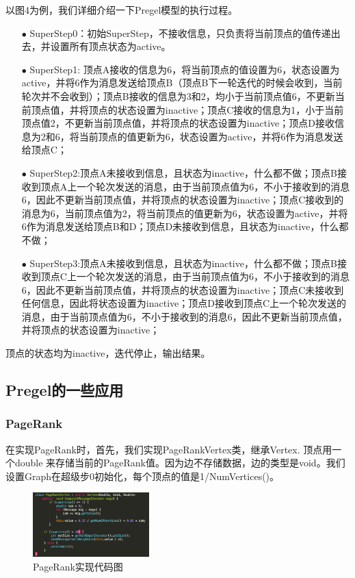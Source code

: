\documentclass[10pt,a4paper,twocolumn,twoside,UTF8]{ctexart}
\begin{document}
	以图4为例，我们详细介绍一下Pregel模型的执行过程。\par	
	\begin{itemize}
		\item[$\bullet$] SuperStep0：初始SuperStep，不接收信息，只负责将当前顶点的值传递出去，并设置所有顶点状态为active。
		\item[$\bullet$] SuperStep1: 顶点A接收的信息为6，将当前顶点的值设置为6，状态设置为active，并将6作为消息发送给顶点B（顶点B下一轮迭代的时候会收到，当前轮次并不会收到）；顶点B接收的信息为3和2，均小于当前顶点值6，不更新当前顶点值，并将顶点的状态设置为inactive；顶点C接收的信息为1，小于当前顶点值2，不更新当前顶点值，并将顶点的状态设置为inactive；顶点D接收信息为2和6，将当前顶点的值更新为6，状态设置为active，并将6作为消息发送给顶点C；
		\item[$\bullet$]SuperStep2:顶点A未接收到信息，且状态为inactive，什么都不做；顶点B接收到顶点A上一个轮次发送的消息，由于当前顶点值为6，不小于接收到的消息6，因此不更新当前顶点值，并将顶点的状态设置为inactive；顶点C接收到的消息为6，当前顶点值为2，将当前顶点的值更新为6，状态设置为active，并将6作为消息发送给顶点B和D；顶点D未接收到信息，且状态为inactive，什么都不做；
		\item[$\bullet$]SuperStep3:顶点A未接收到信息，且状态为inactive，什么都不做；顶点B接收到顶点C上一个轮次发送的消息，由于当前顶点值为6，不小于接收到的消息6，因此不更新当前顶点值，并将顶点的状态设置为inactive；顶点C未接收到任何信息，因此将状态设置为inactive；顶点D接收到顶点C上一个轮次发送的消息，由于当前顶点值为6，不小于接收到的消息6，因此不更新当前顶点值，并将顶点的状态设置为inactive；
	\end{itemize}
	
	顶点的状态均为inactive，迭代停止，输出结果。
	
	\subsection{Pregel的一些应用}
	\subsubsection{PageRank}
	在实现PageRank时，首先，我们实现PageRankVertex类，继承Vertex. 顶点用一个double 来存储当前的PageRank值。因为边不存储数据，边的类型是void。我们设置Graph在超级步0初始化，每个顶点的值是1/NumVertices()。
	\begin{figure}[htbp]
		\centering
		\includegraphics[width=0.4\textwidth]{img//pic5.png}
		\caption{PageRank实现代码图}
		\label{pic5}
	\end{figure}
	
\end{document}

